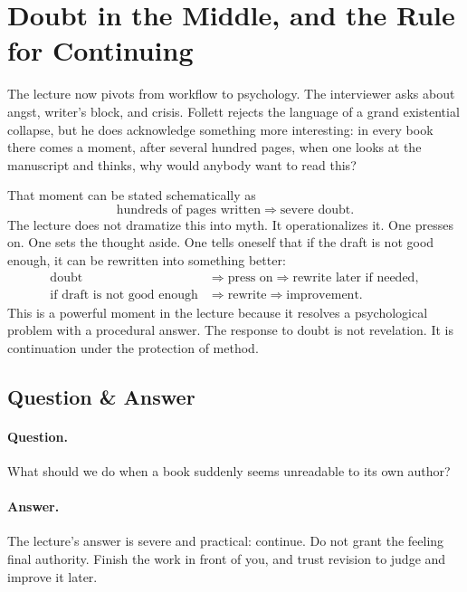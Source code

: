 \section{Doubt in the Middle, and the Rule for Continuing}

The lecture now pivots from workflow to psychology. The interviewer asks about angst, writer's block, and crisis. Follett rejects the language of a grand existential collapse, but he does acknowledge something more interesting: in every book there comes a moment, after several hundred pages, when one looks at the manuscript and thinks, why would anybody want to read this?

That moment can be stated schematically as
\begin{equation}
\text{hundreds of pages written} \Rightarrow \text{severe doubt}.
\end{equation}
The lecture does not dramatize this into myth. It operationalizes it. One presses on. One sets the thought aside. One tells oneself that if the draft is not good enough, it can be rewritten into something better:
\begin{align}
\text{doubt} &\Rightarrow \text{press on} \Rightarrow \text{rewrite later if needed},\\
\text{if draft is not good enough} &\Rightarrow \text{rewrite} \Rightarrow \text{improvement}.
\end{align}
This is a powerful moment in the lecture because it resolves a psychological problem with a procedural answer. The response to doubt is not revelation. It is continuation under the protection of method.

\subsection{Question \& Answer}

\paragraph{Question.} What should we do when a book suddenly seems unreadable to its own author?

\paragraph{Answer.} The lecture's answer is severe and practical: continue. Do not grant the feeling final authority. Finish the work in front of you, and trust revision to judge and improve it later.


